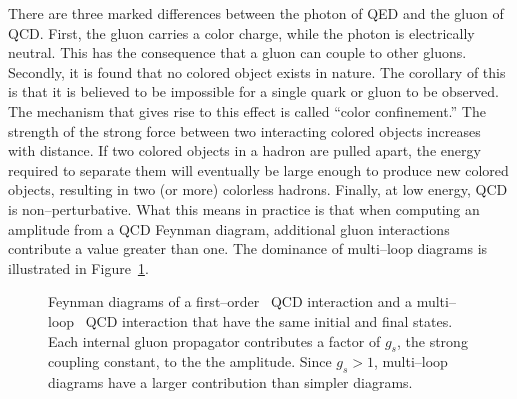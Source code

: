 There are three marked differences between the photon of QED and the gluon of
QCD\@.  First, the gluon carries a color charge, while the photon is
electrically neutral.  This has the consequence that a gluon can couple to other
gluons.  Secondly, it is found that no colored object exists in nature.  The
corollary of this is that it is believed to be impossible for a single quark or
gluon to be observed.  The mechanism that gives rise to this effect is called
``color confinement.''  The strength of the strong force between two interacting
colored objects increases with distance.  If two colored objects in a hadron are
pulled apart, the energy required to separate them will eventually be large
enough to produce new colored objects, resulting in two (or more) colorless
hadrons.  Finally, at low energy, QCD is non--perturbative.  What this means in
practice is that when computing an amplitude from a QCD Feynman diagram,
additional gluon interactions contribute a value greater than one.  The
dominance of multi--loop diagrams is illustrated in
Figure~\ref{fig:QCDFeynmanDiagrams}.
\begin{figure}
  \centering
   \label{fig:QCDFeynmanDiagrams}
  \caption[QCD Feynman Diagrams]{Feynman diagrams of a
  first--order~ QCD interaction and a
  multi--loop~ QCD interaction that have
  the same initial and final states.  Each internal gluon propagator contributes
  a factor of $g_s$, the strong coupling constant, to the the amplitude.  Since
  $g_s > 1$, multi--loop diagrams have a larger contribution than simpler
  diagrams.}
\end{figure}
